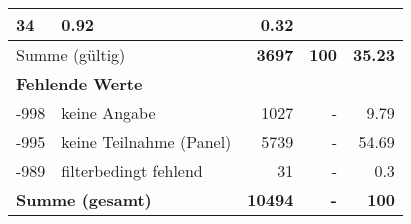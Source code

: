 \begin{longtable}{lXrrr}
       \num{34} &
       \num[round-mode=places,round-precision=2]{0.92} &
         \num[round-mode=places,round-precision=2]{0.32} \\
     \midrule
     \multicolumn{2}{l}{Summe (gültig)} &
       \textbf{\num{3697}} &
     \textbf{\num{100}} &
       \textbf{\num[round-mode=places,round-precision=2]{35.23}} \\
     \multicolumn{5}{l}{\textbf{Fehlende Werte}}\\
       -998 &
       keine Angabe &
         \num{1027} &
        - &
         \num[round-mode=places,round-precision=2]{9.79} \\
       -995 &
       keine Teilnahme (Panel) &
         \num{5739} &
        - &
         \num[round-mode=places,round-precision=2]{54.69} \\
       -989 &
       filterbedingt fehlend &
         \num{31} &
        - &
         \num[round-mode=places,round-precision=2]{0.3} \\
     \midrule
     \multicolumn{2}{l}{\textbf{Summe (gesamt)}} &
          \textbf{\num{10494}} &
        \textbf{-} &
        \textbf{\num{100}} \\
     \bottomrule
     \end{longtable}
     
